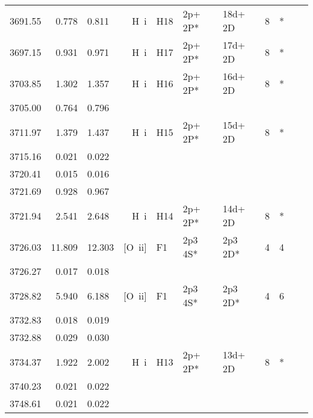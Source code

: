 \begin{longtable}{lrlrlllllll}
 3691.55 &   0.778 &   0.811 &  H~{\sc i}       &  H18       &  2p+ 2P*   &  18d+ 2D   &          8 &        *    \\
 3697.15 &   0.931 &   0.971 &  H~{\sc i}       &  H17       &  2p+ 2P*   &  17d+ 2D   &          8 &        *    \\
 3703.85 &   1.302 &   1.357 &  H~{\sc i}       &  H16       &  2p+ 2P*   &  16d+ 2D   &          8 &        *    \\
 3705.00 &   0.764 &   0.796                                                                                      \\
 3711.97 &   1.379 &   1.437 &  H~{\sc i}       &  H15       &  2p+ 2P*   &  15d+ 2D   &          8 &        *    \\
 3715.16 &   0.021 &   0.022                                                                                      \\
 3720.41 &   0.015 &   0.016                                                                                      \\
 3721.69 &   0.928 &   0.967                                                                                      \\
 3721.94 &   2.541 &   2.648 &  H~{\sc i}       &  H14       &  2p+ 2P*   &  14d+ 2D   &          8 &        *    \\
 3726.03 &  11.809 &  12.303 &  [O~{\sc ii}]    &  F1        &  2p3 4S*   &  2p3 2D*   &          4 &        4    \\
 3726.27 &   0.017 &   0.018                                                                                      \\
 3728.82 &   5.940 &   6.188 &  [O~{\sc ii}]    &  F1        &  2p3 4S*   &  2p3 2D*   &          4 &        6    \\
 3732.83 &   0.018 &   0.019                                                                                      \\
 3732.88 &   0.029 &   0.030                                                                                      \\
 3734.37 &   1.922 &   2.002 &  H~{\sc i}       &  H13       &  2p+ 2P*   &  13d+ 2D   &          8 &        *    \\
 3740.23 &   0.021 &   0.022                                                                                      \\
 3748.61 &   0.021 &   0.022                                                                                      \\

\end{longtable}
